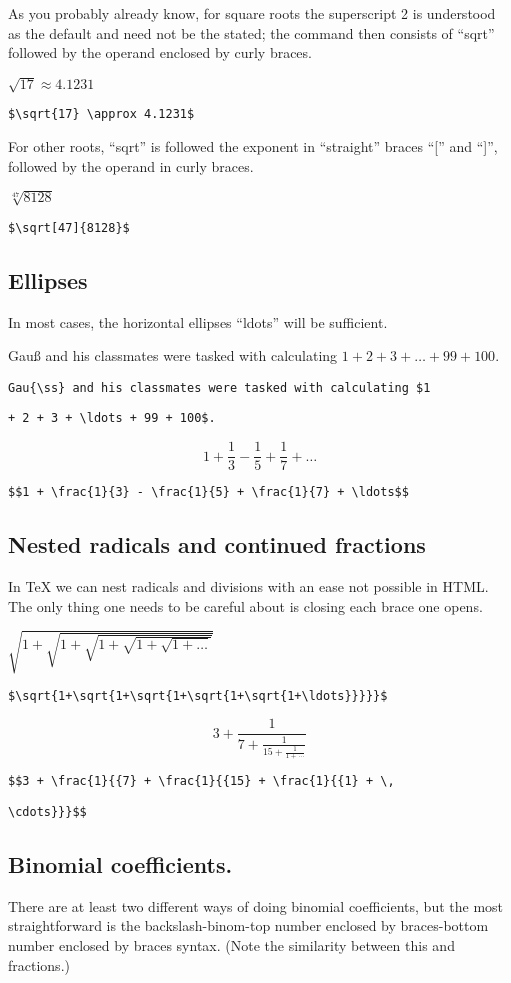 As you probably already know, for square roots the superscript 2 is understood as the default and need not be the stated; the command then consists of ``sqrt'' followed by the operand enclosed by curly braces.

$\sqrt{17} \approx 4.1231$

\verb'$\sqrt{17} \approx 4.1231$'

For other roots, ``sqrt'' is followed the exponent in ``straight'' braces ``['' and ``]'', followed by the operand in curly braces.

$\sqrt[47]{8128}$

\verb'$\sqrt[47]{8128}$'

\subsection{Ellipses}

In most cases, the horizontal ellipses ``ldots'' will be sufficient.

Gau{\ss} and his classmates were tasked with calculating $1 + 2 + 3 + \ldots + 99 + 100$.

\verb'Gau{\ss} and his classmates were tasked with calculating $1'

\verb'+ 2 + 3 + \ldots + 99 + 100$.'

$$1 + \frac{1}{3} - \frac{1}{5} + \frac{1}{7} + \ldots$$

\verb'$$1 + \frac{1}{3} - \frac{1}{5} + \frac{1}{7} + \ldots$$'

\subsection{Nested radicals and continued fractions}

In \TeX{} we can nest radicals and divisions with an ease not possible in HTML. The only thing one needs to be careful about is closing each brace one opens.

$\sqrt{1+\sqrt{1+\sqrt{1+\sqrt{1+\sqrt{1+\ldots}}}}}$

\verb'$\sqrt{1+\sqrt{1+\sqrt{1+\sqrt{1+\sqrt{1+\ldots}}}}}$'

$$3 + \frac{1}{{7} + \frac{1}{{15} + \frac{1}{{1} + \, \cdots}}}$$

\verb'$$3 + \frac{1}{{7} + \frac{1}{{15} + \frac{1}{{1} + \,'

\verb'\cdots}}}$$'

\subsection{Binomial coefficients.} There are at least two different ways of doing binomial coefficients, but the most straightforward is the backslash-binom-top number enclosed by braces-bottom number enclosed by braces syntax. (Note the similarity between this and fractions.)

